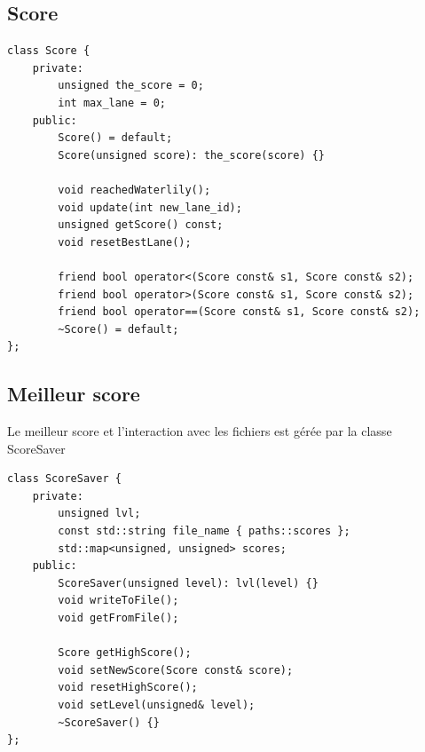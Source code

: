 \documentclass[a4paper, 12pt]{article}
\begin{document}
\subsection{Score}
\begin{lstlisting}
class Score {
    private:
        unsigned the_score = 0;
        int max_lane = 0;
    public:
        Score() = default;
        Score(unsigned score): the_score(score) {}

        void reachedWaterlily();
        void update(int new_lane_id);
        unsigned getScore() const;
        void resetBestLane();

        friend bool operator<(Score const& s1, Score const& s2);
        friend bool operator>(Score const& s1, Score const& s2);
        friend bool operator==(Score const& s1, Score const& s2);
        ~Score() = default;
};
\end{lstlisting}
\subsection{Meilleur score}
Le meilleur score et l'interaction avec les fichiers est gérée par la classe ScoreSaver
\begin{lstlisting}
class ScoreSaver {
    private:
        unsigned lvl;
        const std::string file_name { paths::scores };
        std::map<unsigned, unsigned> scores;
    public:
        ScoreSaver(unsigned level): lvl(level) {}
        void writeToFile();
        void getFromFile();

        Score getHighScore();
        void setNewScore(Score const& score);
        void resetHighScore();
        void setLevel(unsigned& level);
        ~ScoreSaver() {}
};
\end{lstlisting}
\end{document}

